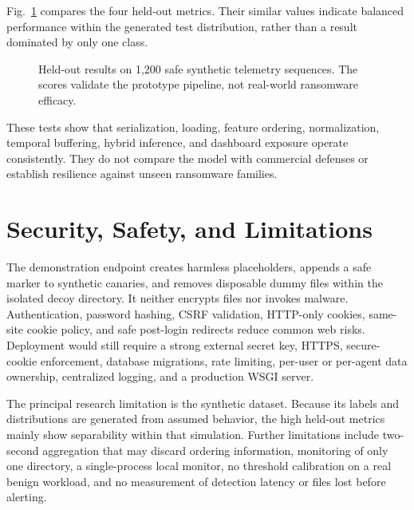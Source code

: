 \documentclass[conference]{IEEEtran}
\begin{document}
Fig.~\ref{fig:metrics} compares the four held-out metrics. Their similar values
indicate balanced performance within the generated test distribution, rather
than a result dominated by only one class.

\begin{figure}[t]
\centering
{}
\caption{Held-out results on 1,200 safe synthetic telemetry sequences. The scores
validate the prototype pipeline, not real-world ransomware efficacy.}
\label{fig:metrics}
\end{figure}

These tests show that serialization, loading, feature ordering, normalization,
temporal buffering, hybrid inference, and dashboard exposure operate consistently. They do
not compare the model with commercial defenses or establish resilience against
unseen ransomware families.

\section{Security, Safety, and Limitations}
The demonstration endpoint creates harmless placeholders, appends a safe marker
to synthetic canaries, and removes disposable dummy files within the isolated
decoy directory. It neither
encrypts files nor invokes malware. Authentication,
password hashing, CSRF validation, HTTP-only cookies, same-site cookie policy,
and safe post-login redirects reduce common web risks. Deployment would still
require a strong external secret key, HTTPS, secure-cookie enforcement, database
migrations, rate limiting, per-user or per-agent data ownership, centralized
logging, and a production WSGI server.

The principal research limitation is the synthetic dataset. Because its labels
and distributions are generated from assumed behavior, the high held-out metrics
mainly show separability within that simulation. Further limitations include
two-second aggregation that may discard ordering information, monitoring of only
one directory, a single-process local monitor, no threshold calibration on a
real benign workload, and no measurement of detection latency or files lost
before alerting.
\end{document}
